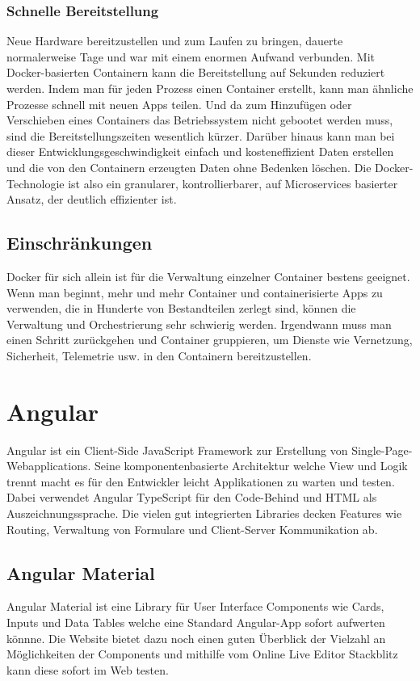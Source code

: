 \subsubsection{Schnelle Bereitstellung}

Neue Hardware bereitzustellen und zum Laufen zu bringen, dauerte normalerweise Tage und war mit einem enormen Aufwand verbunden. Mit Docker-basierten Containern kann die Bereitstellung auf Sekunden reduziert werden. 
Indem man für jeden Prozess einen Container erstellt, kann man ähnliche Prozesse schnell mit neuen Apps teilen. Und da zum Hinzufügen oder Verschieben eines Containers das 
Betriebssystem nicht gebootet werden muss, sind die Bereitstellungszeiten wesentlich kürzer. Darüber hinaus kann man bei dieser Entwicklungsgeschwindigkeit 
einfach und kosteneffizient Daten erstellen und die von den Containern erzeugten Daten ohne Bedenken löschen.
Die Docker-Technologie ist also ein granularer, kontrollierbarer, auf Microservices basierter Ansatz, der deutlich effizienter ist.
\cite{sysarch-docker-1}

\subsection{Einschränkungen}

Docker für sich allein ist für die Verwaltung einzelner Container bestens geeignet. Wenn man beginnt, mehr und mehr Container und containerisierte Apps zu verwenden, 
die in Hunderte von Bestandteilen zerlegt sind, können die Verwaltung und Orchestrierung sehr schwierig werden. Irgendwann muss man einen Schritt zurückgehen und Container gruppieren, 
um Dienste wie Vernetzung, Sicherheit, Telemetrie usw. in den Containern bereitzustellen.
\cite{sysarch-docker-1}

\section{Angular}

Angular ist ein Client-Side JavaScript Framework zur Erstellung von Single-Page-Webapplications. 
Seine komponentenbasierte Architektur welche View und Logik trennt macht es für den Entwickler leicht 
Applikationen zu warten und testen. Dabei verwendet Angular TypeScript für den Code-Behind und HTML als Auszeichnungssprache. 
Die vielen gut integrierten Libraries decken Features wie Routing, Verwaltung von Formulare und Client-Server Kommunikation ab. 

\subsection{Angular Material}
Angular Material ist eine Library für User Interface Components wie Cards, Inputs und Data Tables welche eine Standard Angular-App sofort aufwerten könnne.
Die Website bietet dazu noch einen guten Überblick der Vielzahl an Möglichkeiten der Components und mithilfe vom Online Live Editor Stackblitz kann diese sofort im Web testen. 
\cite{sysarch-angularMaterial-1}

